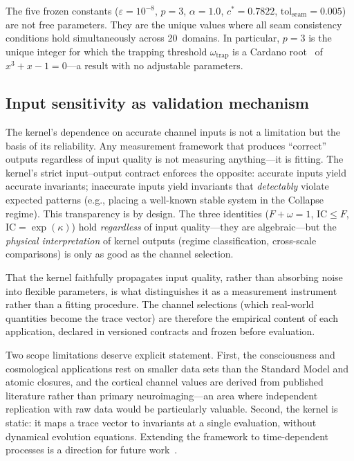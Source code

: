 \documentclass[11pt]{article}
\newcommand{\eps}{\varepsilon}
\newcommand{\IC}{\mathrm{IC}}
\begin{document}
The five frozen constants ($\eps = 10^{-8}$, $p = 3$,
$\alpha = 1.0$, $c^* = 0.7822$,
$\mathrm{tol}_{\mathrm{seam}} = 0.005$) are not free parameters.
They are the unique values where all seam consistency conditions
hold simultaneously across 20~domains. In particular, $p = 3$ is the
unique integer for which the trapping threshold
$\omega_{\mathrm{trap}}$ is a Cardano root~\cite{cardano1545} of
$x^3 + x - 1 = 0$---a result with no adjustable parameters.

\subsection{Input sensitivity as validation mechanism}

The kernel's dependence on accurate channel inputs is not a
limitation but the basis of its reliability. Any measurement
framework that produces ``correct'' outputs regardless of input
quality is not measuring anything---it is fitting. The kernel's
strict input--output contract enforces the opposite: accurate
inputs yield accurate invariants; inaccurate inputs yield
invariants that \emph{detectably} violate expected patterns (e.g.,
placing a well-known stable system in the Collapse regime). This
transparency is by design. The three identities ($F + \omega = 1$,
$\IC \leq F$, $\IC = \exp(\kappa)$) hold \emph{regardless} of
input quality---they are algebraic---but the \emph{physical
interpretation} of kernel outputs (regime classification, cross-scale
comparisons) is only as good as the channel selection.

That the kernel faithfully propagates input quality, rather than
absorbing noise into flexible parameters, is what distinguishes it
as a measurement instrument rather than a fitting procedure. The
channel selections (which real-world quantities become the trace
vector) are therefore the empirical content of each application,
declared in versioned contracts and frozen before evaluation.

Two scope limitations deserve explicit statement. First, the
consciousness and cosmological applications rest on smaller data
sets than the Standard Model and atomic closures, and the cortical
channel values are derived from published literature rather than
primary neuroimaging---an area where independent replication with
raw data would be particularly valuable. Second, the kernel is
static: it maps a trace vector to invariants at a single
evaluation, without dynamical evolution equations. Extending the
framework to time-dependent processes is a direction for future
work~\cite{paulus2025umcp}.
\end{document}
